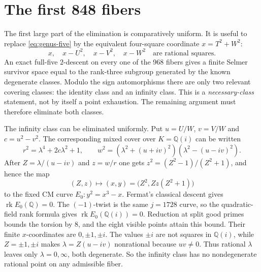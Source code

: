 \documentclass[11pt,a4paper]{amsart}
\newcommand{\Q}{\mathbb Q}
\newcommand{\rk}{\operatorname{rk}}
\begin{document}
\section{The first 848 fibers}

The first large part of the elimination is comparatively uniform. It is useful to replace \eqref{eq:genus-five} by the equivalent four-square coordinate $x=T^2+W^2$:
\begin{equation}\label{eq:four-square}
x,\quad x-U^2,\quad x-V^2,\quad x-W^2\quad\text{are rational squares}.
\end{equation}
An exact full-five $2$-descent on every one of the 968 fibers gives a finite Selmer survivor space equal to the rank-three subgroup generated by the known degenerate classes. Modulo the sign automorphisms there are only two relevant covering classes: the identity class and an infinity class. This is a \emph{necessary-class} statement, not by itself a point exhaustion. The remaining argument must therefore eliminate both classes.

The infinity class can be eliminated uniformly. Put $u=U/W$, $v=V/W$ and $c=u^2-v^2$. The corresponding mixed cover over $K=\Q(i)$ can be written
\[
r^2=\lambda^4+2c\lambda^2+1,\qquad
w^2=(\lambda^2+(u+iv)^2)(\lambda^2-(u-iv)^2).
\]
After $Z=\lambda/(u-iv)$ and $z=w/r$ one gets $z^2=(Z^2-1)/(Z^2+1)$, and hence the map
\[
(Z,z)\longmapsto (x,y)=\bigl(Z^2,Zz(Z^2+1)\bigr)
\]
to the fixed CM curve $E_0:y^2=x^3-x$. Fermat's classical descent gives $\rk E_0(\Q)=0$. The $(-1)$-twist is the same $j=1728$ curve, so the quadratic-field rank formula gives $\rk E_0(\Q(i))=0$. Reduction at split good primes bounds the torsion by $8$, and the eight visible points attain this bound. Their finite $x$-coordinates are $0,\pm1,\pm i$. The values $\pm i$ are not squares in $\Q(i)$, while $Z=\pm1,\pm i$ makes $\lambda=Z(u-iv)$ nonrational because $uv\ne0$. Thus rational $\lambda$ leaves only $\lambda=0,\infty$, both degenerate. So the infinity class has no nondegenerate rational point on any admissible fiber.
\end{document}
